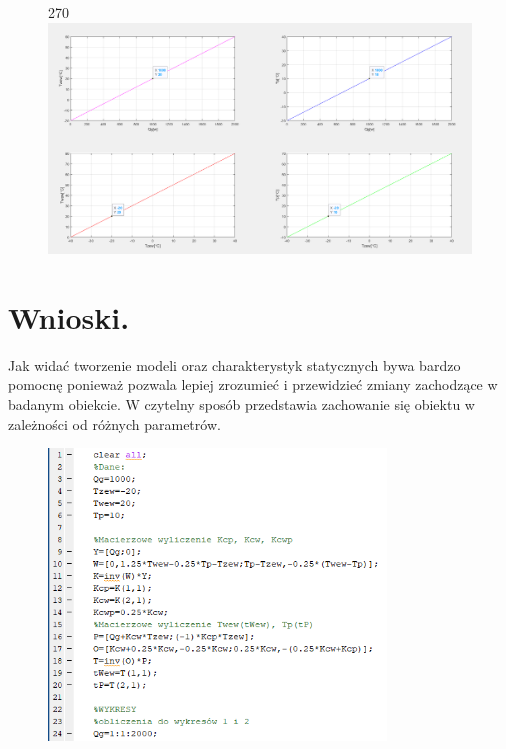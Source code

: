 \documentclass{article}
\begin{document}
\begin{figure}
    \centering
    \begin{turn}{270}
    \includegraphics[width=1.5\textwidth]{Dom_wykresy.png}
    \end{turn}
    \label{fig:my_label}
\end{figure}

\section{Wnioski.}
Jak widać tworzenie modeli oraz charakterystyk statycznych bywa bardzo pomocnę ponieważ pozwala lepiej zrozumieć i przewidzieć zmiany zachodzące w badanym obiekcie. W czytelny sposób przedstawia zachowanie się obiektu w zależności od różnych parametrów.  
\begin{figure}
    \centering
    \includegraphics[width=0.8\textwidth]{kod1.png}
    \label{fig:my_label}
\end{figure}
\end{document}
